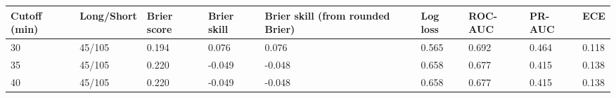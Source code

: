 \begin{tabular}{lllllllll}
\toprule
Cutoff (min) & Long/Short & Brier score & Brier skill & Brier skill (from rounded Brier) & Log loss & ROC-AUC & PR-AUC & ECE \\
\midrule
30 & 45/105 & 0.194 & 0.076 & 0.076 & 0.565 & 0.692 & 0.464 & 0.118 \\
35 & 45/105 & 0.220 & -0.049 & -0.048 & 0.658 & 0.677 & 0.415 & 0.138 \\
40 & 45/105 & 0.220 & -0.049 & -0.048 & 0.658 & 0.677 & 0.415 & 0.138 \\
\bottomrule
\end{tabular}
